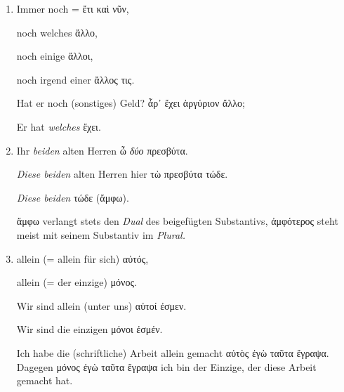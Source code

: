 \begin{enumerate}[leftmargin=0pt,rightmargin=0pt,listparindent =1cm,labelindent=1cm,labelsep=1ex,labelwidth={*},itemindent={*},align=left]
\begin{continuousitemline}
Wer sonst? \textgreek[variant=ancient]{τίς ἄλλος;}\par\end{continuousitemline}

\item Immer noch = \textgreek[variant=ancient]{ἔτι καὶ νῦν,}


\begin{continuousitemline}noch welches \textgreek[variant=ancient]{ἄλλο,}


noch einige \textgreek[variant=ancient]{ἄλλοι,}


noch irgend einer \textgreek[variant=ancient]{ἄλλος τις.}


Hat er noch (sonstiges) Geld? \textgreek[variant=ancient]{ἆρ᾽ ἔχει
ἀργύριον ἄλλο;}


Er hat \emph{welches} \textgreek[variant=ancient]{ἔχει.}\par\end{continuousitemline}

\item Ihr \emph{beiden} alten Herren \textgreek[variant=ancient]{ὦ \emph{δύο}
πρεσβύτα.}


\begin{continuousitemline}\emph{Diese beiden} alten Herren hier \textgreek[variant=ancient]{τὼ
πρεσβύτα τώδε.}


\emph{Diese beiden} \textgreek[variant=ancient]{τώδε (ἄμφω).}\par\end{continuousitemline}


\textgreek[variant=ancient]{ἄμφω} verlangt stets den \emph{Dual}
des beigefügten Substantivs, \textgreek[variant=ancient]{ἀμφότερος}
steht meist mit seinem Substantiv im \emph{Plural.}

\item allein (= allein für sich) \textgreek[variant=ancient]{αὐτός,}


\begin{continuousitemline}allein (= der einzige) \textgreek[variant=ancient]{μόνος.}


Wir sind allein (unter uns) \textgreek[variant=ancient]{αὐτοί ἐσμεν.}


Wir sind die einzigen \textgreek[variant=ancient]{μόνοι ἐσμέν.}\par\end{continuousitemline}


Ich habe die (schriftliche) Arbeit allein gemacht \textgreek[variant=ancient]{αὐτὸς
ἐγὼ ταῦτα ἔγραψα.} Dagegen \textgreek[variant=ancient]{μόνος ἐγὼ ταῦτα
ἔγραψα} ich bin der Einzige, der diese Arbeit gemacht hat.


\end{enumerate}
